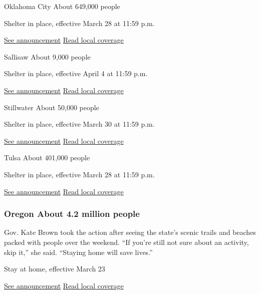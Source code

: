 Oklahoma City About 649,000 people

Shelter in place, effective March 28 at 11:59 p.m.

\href{https://www.okc.gov/Home/Components/News/News/3321/18}{See
announcement} \textbar{}
\href{https://oklahoman.com/article/5658851/coronavirus-in-oklahoma-oklahoma-city-to-implement-shelter-in-place-order}{Read
local coverage}

Sallisaw About 9,000 people

Shelter in place, effective April 4 at 11:59 p.m.

\href{http://www.sallisawok.org/DocumentCenter/View/1505/COVID19PROCLAMATIONSallisaw}{See
announcement} \textbar{}
\href{https://www.4029tv.com/article/sallisaw-mayor-orders-people-to-shelter-in-place/32038696}{Read
local coverage}

Stillwater About 50,000 people

Shelter in place, effective March 30 at 11:59 p.m.

\href{http://stillwater.org/files/news-releases/covid-declarations/copiers_20200330_114236.pdf}{See
announcement} \textbar{}
\href{https://www.stwnewspress.com/covid-19/shelter-in-place-for-stillwater-going-into-effect-just-before/article_245f9bd0-72b6-11ea-8fc8-63cef71d9e5e.html}{Read
local coverage}

Tulsa About 401,000 people

Shelter in place, effective March 28 at 11:59 p.m.

\href{http://www.cityoftulsa.org/media/12617/2020-04.pdf}{See
announcement} \textbar{}
\href{https://www.tulsaworld.com/news/not-a-recommendation-mayor-g-t-bynum-issues-shelter-in/article_5d2fda2b-0b00-5119-80fd-a3f25e7cde81.html}{Read
local coverage}

\hypertarget{oregon-about-42-million-people}{%
\subsubsection{Oregon About 4.2 million
people}\label{oregon-about-42-million-people}}

Gov. Kate Brown took the action after seeing the state's scenic trails
and beaches packed with people over the weekend. ``If you're still not
sure about an activity, skip it,'' she said. ``Staying home will save
lives.''

Stay at home, effective March 23

\href{https://govsite-assets.s3.amazonaws.com/jkAULYKcSh6DoDF8wBM0_EO\%2020-12.pdf}{See
announcement} \textbar{}
\href{https://www.oregonlive.com/coronavirus/2020/03/its-a-matter-of-life-or-death-gov-kate-brown-begs-oregonians-to-stay-home-as-people-crowd-coast-gorge.html}{Read
local coverage}

